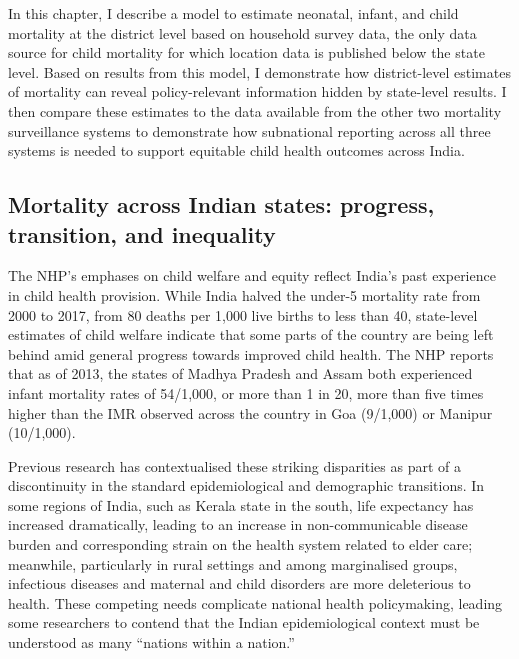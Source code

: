 \documentclass[
]{report}
\begin{document}
In this chapter, I describe a model to estimate neonatal, infant, and child mortality at the district level based on household survey data, the only data source for child mortality for which location data is published below the state level. Based on results from this model, I demonstrate how district-level estimates of mortality can reveal policy-relevant information hidden by state-level results. I then compare these estimates to the data available from the other two mortality surveillance systems to demonstrate how subnational reporting across all three systems is needed to support equitable child health outcomes across India.

\hypertarget{mortality-across-indian-states-progress-transition-and-inequality}{%
\subsection{Mortality across Indian states: progress, transition, and inequality}\label{mortality-across-indian-states-progress-transition-and-inequality}}

The NHP's emphases on child welfare and equity reflect India's past experience in child health provision. While India halved the under-5 mortality rate from 2000 to 2017, from 80 deaths per 1,000 live births to less than 40,\autocite{Dicker2018} state-level estimates of child welfare indicate that some parts of the country are being left behind amid general progress towards improved child health. The NHP reports that as of 2013, the states of Madhya Pradesh and Assam both experienced infant mortality rates of 54/1,000, or more than 1 in 20, more than five times higher than the IMR observed across the country in Goa (9/1,000) or Manipur (10/1,000).\autocite{IND_MOHFW2017}

Previous research has contextualised these striking disparities as part of a discontinuity in the standard epidemiological and demographic transitions. In some regions of India, such as Kerala state in the south, life expectancy has increased dramatically, leading to an increase in non-communicable disease burden and corresponding strain on the health system related to elder care;\autocite{Yadav2014} meanwhile, particularly in rural settings and among marginalised groups, infectious diseases and maternal and child disorders are more deleterious to health.\autocite{Dandona2017} These competing needs complicate national health policymaking, leading some researchers to contend that the Indian epidemiological context must be understood as many ``nations within a nation.''\autocite{Dandona2017}
\end{document}
